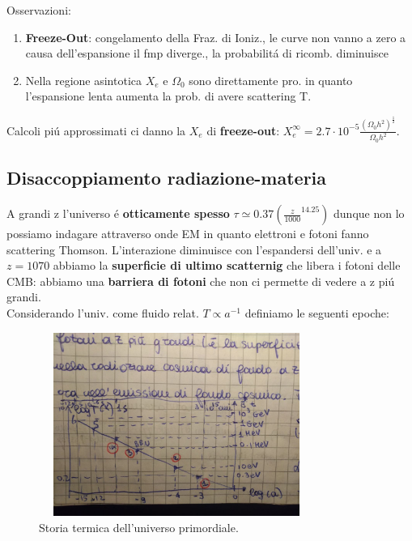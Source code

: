 \documentclass[12pt, a4paper]{article}
\begin{document}
Osservazioni:
\begin{enumerate}
\item \textbf{Freeze-Out}: congelamento della Fraz. di Ioniz., le curve non vanno a zero a causa dell'espansione il fmp diverge., la probabilit\'{a} di ricomb. diminuisce
\item Nella regione asintotica $X_e$ e $\Omega_0$ sono direttamente pro. in quanto l'espansione lenta aumenta la prob. di avere scattering T.
\end{enumerate}
Calcoli pi\'{u} approssimati ci danno la $X_e$ di \textbf{freeze-out}: $X_e^{\infty}=2.7\cdot 10^{-5} \frac{(\Omega_0 h^2)^{\frac{1}{2}}}{\Omega_0 h^2}$.
\subsection{Disaccoppiamento radiazione-materia}
A grandi z l'universo \'{e} \textbf{otticamente spesso} $\tau \simeq 0.37(\frac{z}{1000}^{14.25})$ dunque non lo possiamo indagare attraverso onde EM in quanto elettroni e fotoni fanno scattering Thomson. L'interazione diminuisce con l'espandersi dell'univ. e a $z=1070$ abbiamo la \textbf{superficie di ultimo scatternig} che libera i fotoni delle CMB: abbiamo una \textbf{barriera di fotoni} che non ci permette di vedere a z pi\'{u} grandi.\\
Considerando l'univ. come fluido relat. $T\propto a ^{-1}$ definiamo le seguenti epoche:
\begin{figure}[htp]
    \centering
    \includegraphics[width=9cm, height=6cm]{images/storia.jpeg}
    \caption{Storia termica dell'universo primordiale.}
    \label{fig:storia}
\end{figure}
\end{document}
